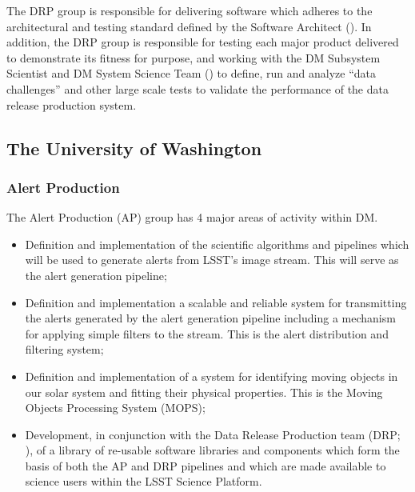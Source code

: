 The DRP group is responsible for delivering software which adheres to the architectural and testing standard defined by the Software Architect ().
In addition, the DRP group is responsible for testing each major product delivered to demonstrate its fitness for purpose, and working with the DM Subsystem Scientist and DM System Science Team () to define, run and analyze ``data challenges'' and other large scale tests to validate the performance of the data release production system.

\subsection {The University of Washington\label{sect:uw}}

\subsubsection{Alert Production\label{sect:ap}}

The Alert Production (AP) group has 4 major areas of activity within DM.

\begin{itemize}

  \item{Definition and implementation of the scientific algorithms and pipelines which will be used to generate alerts from LSST's image stream.  This will serve as the alert generation pipeline;}

  \item{Definition and implementation a scalable and reliable system for transmitting the alerts generated by the alert generation pipeline including a mechanism for applying simple filters to the stream. This is the alert distribution and filtering system;}

  \item{Definition and implementation of a system for identifying moving objects in our solar system and fitting their physical properties. This is the Moving Objects Processing System (MOPS);}

  \item{Development, in conjunction with the Data Release Production team (DRP; ), of a library of re-usable software libraries and components which form the basis of both the AP and DRP pipelines and which are made available to science users within the LSST Science Platform.}

\end{itemize}

